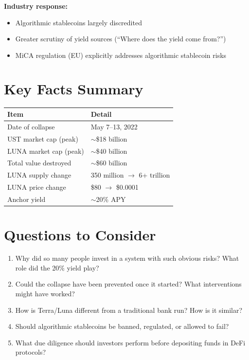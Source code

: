 \documentclass[11pt]{article}
\begin{document}
\medskip
\noindent\textbf{Industry response:}
\begin{itemize}[leftmargin=*]
\item Algorithmic stablecoins largely discredited
\item Greater scrutiny of yield sources (``Where does the yield come from?'')
\item MiCA regulation (EU) explicitly addresses algorithmic stablecoin risks
\end{itemize}

\section*{Key Facts Summary}

\begin{center}
\begin{tabular}{ll}
\toprule
\textbf{Item} & \textbf{Detail} \\
\midrule
Date of collapse & May 7--13, 2022 \\
UST market cap (peak) & $\sim$\$18 billion \\
LUNA market cap (peak) & $\sim$\$40 billion \\
Total value destroyed & $\sim$\$60 billion \\
LUNA supply change & 350 million $\rightarrow$ 6+ trillion \\
LUNA price change & \$80 $\rightarrow$ \$0.0001 \\
Anchor yield & $\sim$20\% APY \\
\bottomrule
\end{tabular}
\end{center}

\section*{Questions to Consider}

\begin{enumerate}[leftmargin=*]
\item Why did so many people invest in a system with such obvious risks? What role did the 20\% yield play?

\item Could the collapse have been prevented once it started? What interventions might have worked?

\item How is Terra/Luna different from a traditional bank run? How is it similar?

\item Should algorithmic stablecoins be banned, regulated, or allowed to fail?

\item What due diligence should investors perform before depositing funds in DeFi protocols?
\end{enumerate}
\end{document}
